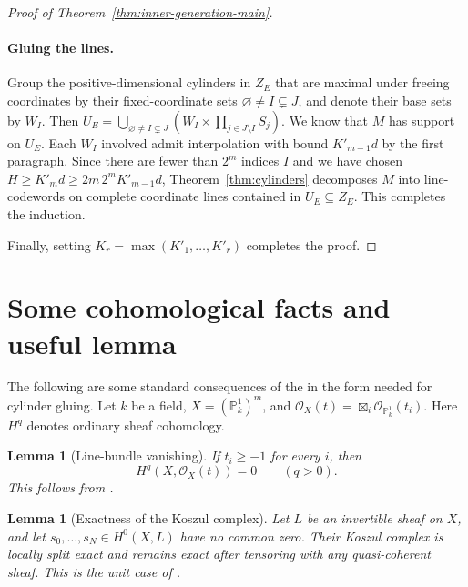 \documentclass[11pt,letterpaper]{article}
\renewcommand{\ge}{\geqslant}
\newtheorem{lemma}[theorem]{Lemma}
\theoremstyle{definition}
\theoremstyle{remark}
\newcommand{\cB}{\mathcal B}
\begin{document}
\begin{proof}[Proof of Theorem~\ref{thm:inner-generation-main}]
\paragraph{Gluing the lines.}
Group the positive-dimensional cylinders in \(Z_E\) that are
maximal under freeing coordinates by their fixed-coordinate sets
\(\varnothing\ne I\subsetneq J\), and denote their base sets
by \(W_I\). Then
$U_E=\bigcup_{\varnothing\ne I\subsetneq J}
\left(W_I\times\prod_{j\in J \setminus I}S_j\right)$.
We know that \(M\) has support on \(U_E\). Each $W_I$ involved admit interpolation with bound $K'_{m-1}d$ by the
first paragraph. Since there are fewer than \(2^m\) indices $I$ and we have chosen
$H\ge K'_md\ge 2m\,2^mK'_{m-1}d$, Theorem~\ref{thm:cylinders} decomposes \(M\) into line-codewords
on complete coordinate lines contained in \(U_E \subseteq Z_E\). This completes the induction.

Finally, setting $K_r = \max(K'_1,\dots,K'_r)$ completes the proof.

\end{proof}


\section{Some cohomological facts and useful lemma}
\label{app:cylinder-tools}
The following are some standard consequences of the \cite{Stacks}
in the form needed for cylinder gluing. Let $k$ be a field,
$X=(\mathbb P^1_k)^m$, and
$\mathcal O_X(t)=\boxtimes_i\mathcal O_{\mathbb P^1_k}(t_i)$.
Here $H^q$ denotes ordinary sheaf cohomology.

\begin{lemma}[Line-bundle vanishing]
\label{lem:cyl-cohomology}
If $t_i\ge-1$ for every $i$, then
\[
 H^q(X,\mathcal O_X(t))=0\qquad(q>0).
\]
This follows from \cite[Lemmas~30.8.1 and~33.29.1,
Tags~01XT and~0BED]{Stacks}.
\end{lemma}

\begin{lemma}[Exactness of the Koszul complex]
\label{lem:cyl-koszul}
Let $L$ be an invertible sheaf on $X$, and let
$s_0,\ldots,s_N\in H^0(X,L)$ have no common zero.
Their Koszul complex is locally split exact and remains exact
after tensoring with any quasi-coherent sheaf.
This is the unit case of
\cite[Lemma~15.29.6, Tag~0663]{Stacks}.
\end{lemma}
\end{document}
